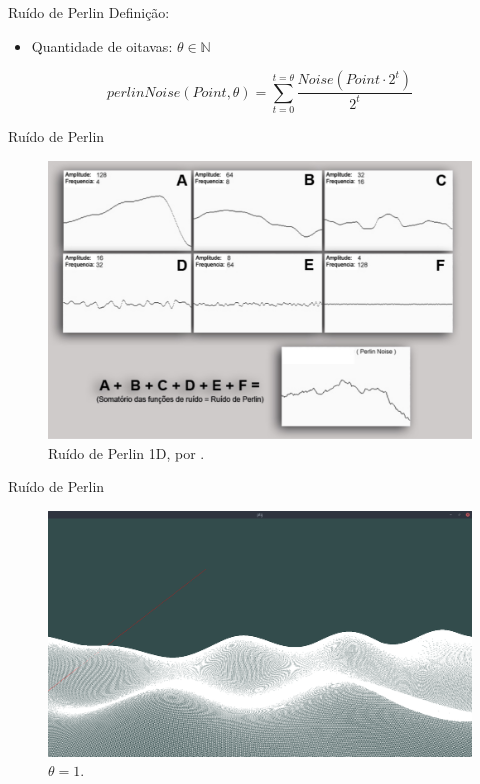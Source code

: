 \begin{frame}{Ruído de Perlin}
    Definição:
    \begin{itemize}
        \item Quantidade de oitavas: $\theta \in \mathbb{N}$
    \end{itemize}
    $$perlinNoise(Point, \theta) = \sum_{t=0}^{t=\theta} \frac{Noise(Point \cdot 2^{t})}{2^{t}}$$
\end{frame}


\begin{frame}{Ruído de Perlin}
    \begin{figure}
		\centering
        \includegraphics[width=.7\textwidth]{img/explain/perlin1d.png}
        \caption{Ruído de Perlin 1D, por \cite{elias2000perlin}.}
    \end{figure}
\end{frame}

\begin{frame}{Ruído de Perlin}
    \begin{figure}
		\centering
        \includegraphics[width=.7\textwidth]{img/explain/octaves1.png}
        \caption{$\theta = 1$.}
    \end{figure}
\end{frame}

